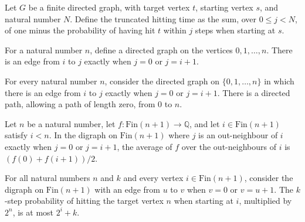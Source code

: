 \begin{definition}
\label{Randomized.hitTime}
\leanok
{}
Let $G$ be a finite directed graph, with target vertex $t$, starting vertex $s$, and
natural number $N$. Define the truncated hitting time as the sum, over $0 \le j < N$, of
one minus the probability of having hit $t$ within $j$ steps when starting at $s$.
\end{definition}

\begin{definition}
\label{Randomized.chainDigraph}
\leanok
For a natural number $n$, define a directed graph on the vertices $0,1,\ldots,n$. There
is an edge from $i$ to $j$ exactly when $j=0$ or $j=i+1$.
\end{definition}

\begin{theorem}
\label{Randomized.chainDigraph_reachable}
\leanok
{}
For every natural number $n$, consider the directed graph on $\{0,1,\ldots,n\}$ in which
there is an edge from $i$ to $j$ exactly when $j=0$ or $j=i+1$. There is a directed
path, allowing a path of length zero, from $0$ to $n$.
\end{theorem}

\begin{theorem}
\label{Randomized.avgOut_chainDigraph}
\leanok
{}
Let $n$ be a natural number, let $f:\mathrm{Fin}(n+1)\to\mathbb{Q}$, and let
$i\in\mathrm{Fin}(n+1)$ satisfy $i<n$. In the digraph on $\mathrm{Fin}(n+1)$
where $j$ is an out-neighbour of $i$ exactly when $j=0$ or $j=i+1$, the average of
$f$ over the out-neighbours of $i$ is $(f(0)+f(i+1))/2$.
\end{theorem}

\begin{theorem}
\label{Randomized.hitProb_chainDigraph_le_aux}
\leanok
{}
For all natural numbers $n$ and $k$ and every vertex $i\in\text{Fin}(n+1)$, consider the
digraph on $\text{Fin}(n+1)$ with an edge from $u$ to $v$ when $v=0$ or $v=u+1$. The
$k$-step probability of hitting the target vertex $n$ when starting at $i$, multiplied
by $2^n$, is at most $2^i+k$.
\end{theorem}

